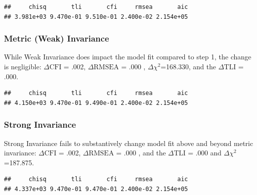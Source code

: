 \documentclass{article}\usepackage[]{graphicx}\usepackage[]{color}
\makeatletter
\newenvironment{kframe}{%
 \def\at@end@of@kframe{}%
 \ifinner\ifhmode%
  \def\at@end@of@kframe{\end{minipage}}%
  \begin{minipage}{\columnwidth}%
 \fi\fi%
 \def\FrameCommand##1{\hskip\@totalleftmargin \hskip-\fboxsep
 \colorbox{shadecolor}{##1}\hskip-\fboxsep
     \hskip-\linewidth \hskip-\@totalleftmargin \hskip\columnwidth}%
 \MakeFramed {\advance\hsize-\width
   \@totalleftmargin\z@ \linewidth\hsize
   \@setminipage}}%
 {\par\unskip\endMakeFramed%
 \at@end@of@kframe}
\newenvironment{knitrout}{}{} %
\makeatother
\begin{document}
\begin{knitrout}
\color{fgcolor}\begin{kframe}
\begin{verbatim}
##     chisq       tli       cfi     rmsea       aic 
## 3.981e+03 9.470e-01 9.510e-01 2.400e-02 2.154e+05
\end{verbatim}
\end{kframe}
\end{knitrout}


\subsubsection*{Metric (Weak) Invariance}
While Weak Invariance does impact the model fit compared to step 1, the change is negligible: $\Delta\mathrm{CFI}$ = .002, $\Delta\mathrm{RMSEA}$ = .000 , $\Delta$$\chi^2$=168.330, and the $\Delta\mathrm{TLI}$ = .000.

\begin{knitrout}
\color{fgcolor}\begin{kframe}
\begin{verbatim}
##     chisq       tli       cfi     rmsea       aic 
## 4.150e+03 9.470e-01 9.490e-01 2.400e-02 2.154e+05
\end{verbatim}
\end{kframe}
\end{knitrout}


\subsubsection*{Strong Invariance}
Strong Invariance fails to substantively change model fit above and beyond metric invariance: $\Delta\mathrm{CFI}$ = .002, $\Delta\mathrm{RMSEA}$ = .000 , and the $\Delta\mathrm{TLI}$ = .000 and $\Delta$$\chi^2$=187.875.
\begin{knitrout}
\color{fgcolor}\begin{kframe}
\begin{verbatim}
##     chisq       tli       cfi     rmsea       aic 
## 4.337e+03 9.470e-01 9.470e-01 2.400e-02 2.154e+05
\end{verbatim}
\end{kframe}
\end{knitrout}
\end{document}
